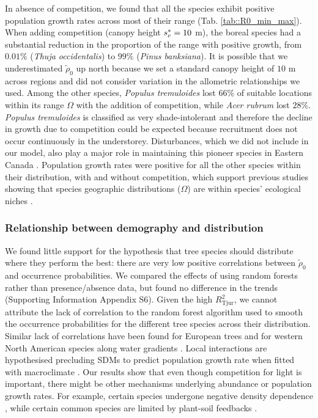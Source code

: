 In absence of competition, we found that all the species exhibit positive population growth rates across most of their range (Tab. \ref{tab::R0_min_max}). When adding competition (canopy height $ {s}^{*}_c = 10 $ m), the boreal species had a substantial reduction in the proportion of the range with positive growth, from $ 0.01 \% $ (\textit{Thuja occidentalis}) to $ 99 \% $ (\textit{Pinus banksiana}). It is possible that we underestimated $ \tilde \rho_0 $ up north because we set a standard canopy height of $ 10 $ m across regions and did not consider variation in the allometric relationships we used. Among the other species, \textit{Populus tremuloides} lost $ 66 \% $ of suitable locations within its range $ \Omega $ with the addition of competition, while \textit{Acer rubrum} lost $ 28 \% $. \textit{Populus tremuloides} is classified as very shade-intolerant \citep{Burns1990a} and therefore the decline in growth due to competition could be expected because recruitment does not occur continuously in the understorey. Disturbances, which we did not include in our model, also play a major role in maintaining this pioneer species in Eastern Canada \citep{Nlungu-Kweta2017}. Population growth rates were positive for all the other species within their distribution, with and without competition, which support previous studies showing that species geographic distributions ($ \Omega $) are within species' ecological niches \citep{Lee-Yaw2016, Csergo2017}.

\subsubsection{Relationship between demography and distribution}
We found little support for the hypothesis that tree species should distribute where they perform the best: there are very low positive correlations between $ \tilde \rho_0 $ and occurrence probabilities. We compared the effects of using random forests rather than presence/absence data, but found no difference in the trends (Supporting Information Appendix S6). Given the high $ R_{\text{Tjur}}^{2} $, we cannot attribute the lack of correlation to the random forest algorithm used to smooth the occurrence probabilities for the different tree species across their distribution. Similar lack of correlations have been found for European trees \citep[using matrix projection models]{Csergo2017} and for western North American species along water gradients \citep{Bohner2019}. Local interactions are hypothesised precluding SDMs to predict population growth rate when fitted with macroclimate \citep{Csergo2017}. Our results show that even though competition for light is important, there might be other mechanisms underlying abundance or population growth rates. For example, certain species undergone negative density dependence \citep[for rare species]{Yenni2012}, while certain common species are limited by plant-soil feedbacks \citep[\textit{Acer saccharum}]{Solarik2019}. \\

